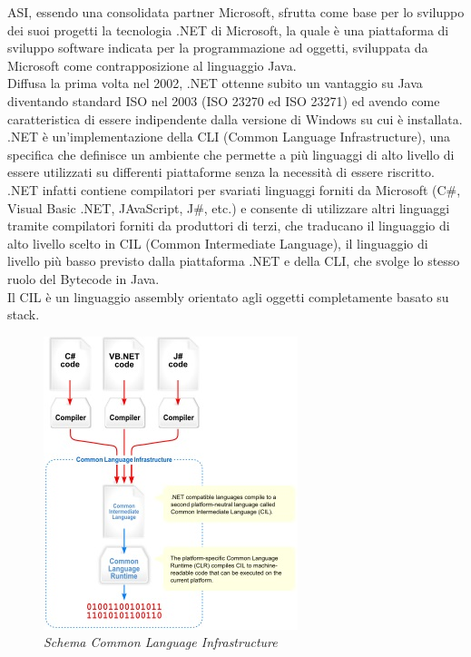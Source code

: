 ASI, essendo una consolidata partner Microsoft, sfrutta come base per lo sviluppo dei suoi progetti la tecnologia .NET di Microsoft, la quale è una piattaforma di sviluppo software indicata per la programmazione ad oggetti, sviluppata da Microsoft come contrapposizione al linguaggio Java.
\\
Diffusa la prima volta nel 2002, .NET ottenne subito un vantaggio su Java diventando standard ISO nel 2003 (ISO 23270 ed ISO 23271) ed avendo come caratteristica di essere indipendente dalla versione di Windows su cui è installata.
\\
.NET è un'implementazione della CLI (Common Language Infrastructure), una specifica che definisce un ambiente che permette a più linguaggi di alto livello di essere utilizzati su differenti piattaforme senza la necessità di essere riscritto.
\\
.NET infatti contiene compilatori per svariati linguaggi forniti da Microsoft (C\#, Visual Basic .NET, JAvaScript, J\#, etc.) e consente di utilizzare altri linguaggi tramite compilatori forniti da produttori di terzi, che traducano il linguaggio di alto livello scelto in CIL (Common Intermediate Language), il linguaggio di livello più basso previsto dalla piattaforma .NET e della CLI, che svolge lo stesso ruolo del Bytecode in Java.
\\
Il CIL è un linguaggio assembly orientato agli oggetti completamente basato su stack.

\begin{figure}[ht]
	\centering
	\includegraphics[scale=0.90]{immagini/processo/CIL.jpg}
	\caption{\textit{Schema Common Language Infrastructure}}
\end{figure}\FloatBarrier

